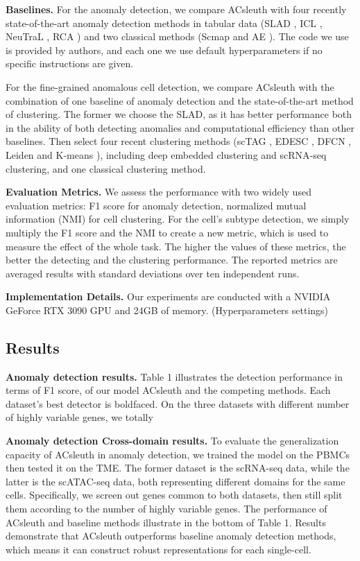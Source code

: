 \documentclass{article}
\begin{document}
\textbf{Baselines.} For the anomaly detection, we compare ACsleuth with four recently 
state-of-the-art anomaly detection methods in tabular data (SLAD \cite{SLAD}, 
ICL \cite{ICL}, NeuTraL \cite{NeuTraL}, RCA \cite{RCA}) and two 
classical methods (Scmap \cite{scmap} and AE \cite{AE}). The code 
we use is provided by authors, and each one we use default hyperparameters if no specific 
instructions are given.

For the fine-grained anomalous cell detection, we compare ACsleuth with the combination of one baseline of 
anomaly detection and the state-of-the-art method of clustering. The former we choose the 
SLAD, as it has better performance both in the ability of both detecting anomalies and 
computational efficiency than other baselines. Then select four recent clustering methods 
(scTAG \cite{scTAG}, EDESC \cite{EDESC}, DFCN \cite{DFCN}, Leiden \cite{leiden} 
and K-means \cite{kmeans}), including deep embedded clustering and scRNA-seq 
clustering, and one classical clustering method. 

\textbf{Evaluation Metrics.}	We assess the performance with two widely used evaluation metrics: 
F1 score for anomaly detection, normalized mutual information (NMI) for cell clustering. 
For the cell’s subtype detection, we simply multiply the F1 score and the NMI to create 
a new metric, which is used to measure the effect of the whole task. The higher the values 
of these metrics, the better the detecting and the clustering performance. The reported 
metrics are averaged results with standard deviations over ten independent runs.

\textbf{Implementation Details.} 	Our experiments are conducted with a 
NVIDIA GeForce RTX 3090 GPU and 24GB of memory.  (Hyperparameters settings)

\subsection{Results}
\textbf{Anomaly detection results.}	Table 1 illustrates the detection performance in terms of 
F1 score, of our model ACsleuth and the competing methods. Each dataset’s best detector is 
boldfaced. On the three datasets with different number of highly variable genes, we totally 

\textbf{Anomaly detection Cross-domain results.}	To evaluate the generalization capacity of ACsleuth 
in anomaly detection, we trained the model on the PBMCs then tested it on the TME. The 
former dataset is the scRNA-seq data, while the latter is the scATAC-seq data, both 
representing different domains for the same cells. Specifically, we screen out genes 
common to both datasets, then still split them according to the number of highly variable 
genes. The performance of ACsleuth and baseline methods illustrate in the bottom of Table 1. Results 
demonstrate that ACsleuth outperforms baseline anomaly detection methods, which means it can 
construct robust representations for each single-cell.
\end{document}
